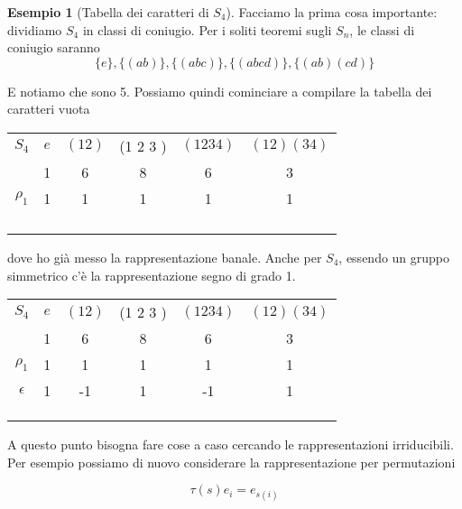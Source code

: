 \documentclass[11pt]{article}
\theoremstyle{plain}
\theoremstyle{definition}
\newtheorem{exmp}{Esempio}[section]
\theoremstyle{remark}
\begin{document}
\begin{exmp}[Tabella dei caratteri di $S_4$]
Facciamo la prima cosa importante: dividiamo $S_4$ in classi di coniugio. Per i soliti teoremi sugli $S_n$, le classi di coniugio saranno 
\[\{e\}, \{(a b)\}, \{(a b c)\}, \{(a b c d)\}, \{(a b)(c d)\}\]

E notiamo che sono 5. Possiamo quindi cominciare a compilare la tabella dei caratteri vuota



\begin{table}[!ht]
\centering
\begin{tabular}{|c|c|c|c|c|c|}
\hline
$S_4$  & $e$ & $(1 2)$ & (1 2 3 ) & $(1 2 3 4)$ & $(1 2)(3 4)$ \\
 & 1 & 6 & 8 & 6 & 3 \\
\hline
 $\rho_1$ & 1 & 1  & 1 & 1 & 1\\
\hline
& &  & & & \\
\hline
& &  & & & \\
\hline
& &  & & & \\
\hline
& &  & & & \\
\hline
\end{tabular}
\end{table}


dove ho già messo la rappresentazione banale. Anche per $S_4$, essendo un gruppo simmetrico c'è la rappresentazione segno di grado 1. 




\begin{table}[!ht]
\centering
\begin{tabular}{|c|c|c|c|c|c|}
\hline
$S_4$  & $e$ & $(1 2)$ & (1 2 3 ) & $(1 2 3 4)$ & $(1 2)(3 4)$ \\
 & 1 & 6 & 8 & 6 & 3 \\
\hline
 $\rho_1$ & 1 & 1  & 1 & 1 & 1\\
\hline
$\epsilon$ & 1  & -1 & 1 & -1 & 1 \\
\hline
& &  & & & \\
\hline
& &  & & & \\
\hline
& &  & & & \\
\hline
\end{tabular}
\end{table}


A questo punto bisogna fare cose a caso cercando le rappresentazioni irriducibili. Per esempio possiamo di nuovo considerare la rappresentazione per permutazioni



\[ \tau(s) e_i = e_{s(i)}\]



\end{exmp}
\end{document}

